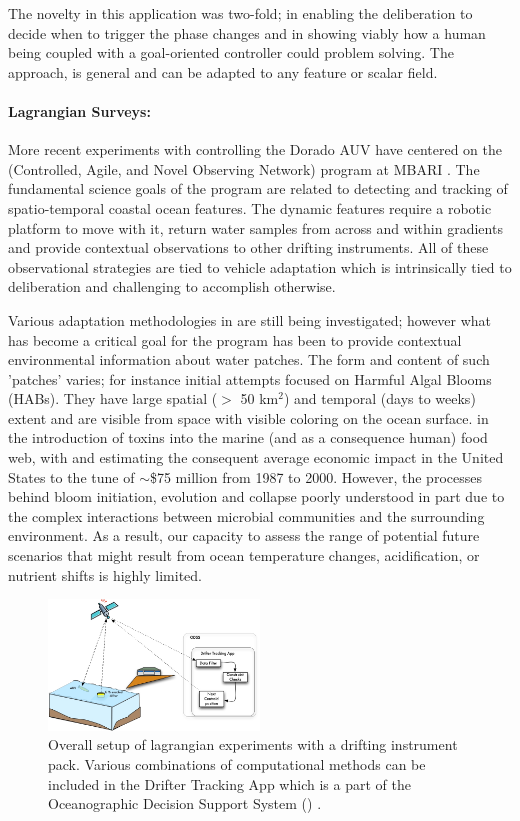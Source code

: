 The novelty in this application was two-fold; in enabling the
deliberation to decide when to trigger the phase changes and in
showing viably how a human being coupled with a goal-oriented
controller could  problem solving. The
approach, is general and can be adapted to any feature or scalar
field.

\paragraph {Lagrangian Surveys:} More recent experiments with \rx
controlling the Dorado AUV have centered on the \can (Controlled,
Agile, and Novel Observing Network) program at MBARI \cite{canon}. The
fundamental science goals of the program are related to detecting and
tracking of spatio-temporal coastal ocean features. The dynamic
features require a robotic platform to move with it, return water
samples from across and within gradients and provide contextual
observations to other drifting instruments. All of these observational
strategies are tied to vehicle adaptation which is intrinsically tied
to deliberation and challenging to accomplish otherwise.

Various adaptation methodologies in \can are still being investigated;
however what has become a critical goal for the program has been to
provide contextual environmental information about water patches. The
form and content of such 'patches' varies; for instance initial
attempts focused on Harmful Algal Blooms (HABs). They have large
spatial ($>$ 50 km$^2$) and temporal (days to weeks) extent and are
visible from space with visible coloring on the ocean
surface.  in the
introduction of toxins into the marine (and as a consequence human)
food web, with \cite{anderson00} and \cite{hoagland06} estimating the
consequent average economic impact in the United States to the tune of
$\sim$\$75 million from 1987 to 2000. However, the processes behind
bloom initiation, evolution and collapse  poorly
understood in part due to the complex interactions between microbial
communities and the surrounding environment. As a result, our capacity
to assess the range of potential future scenarios that might result
from ocean temperature changes, acidification, or nutrient shifts is
highly limited.

\begin{figure}[t]
\centering
\includegraphics[width=0.5\textwidth]{figs/dta-app.jpeg}
\caption{\small{Overall setup of \can lagrangian experiments with a
    drifting instrument pack. Various combinations of computational
    methods can be included in the Drifter Tracking App which is a
    part of the Oceanographic Decision Support System (\od)
    \cite{das11}.}}
\label{fig:dta-setup}
\end{figure}

